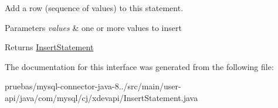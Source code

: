 Add a row (sequence of values) to this statement.


\begin{DoxyParams}{Parameters}
{\em values} & one or more values to insert \\
\hline
\end{DoxyParams}
\begin{DoxyReturn}{Returns}
\mbox{\hyperlink{interfacecom_1_1mysql_1_1cj_1_1xdevapi_1_1_insert_statement}{Insert\+Statement}} 
\end{DoxyReturn}


The documentation for this interface was generated from the following file\+:\begin{DoxyCompactItemize}
\item 
pruebas/mysql-\/connector-\/java-\/8../src/main/user-\/api/java/com/mysql/cj/xdevapi/Insert\+Statement.\+java\end{DoxyCompactItemize}
